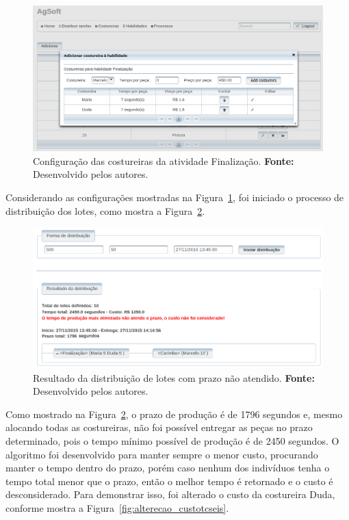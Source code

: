 \begin{figure}[h!]
	\centerline{\includegraphics[width=14.7cm]{./imagens/configuracao_costureiras_teste6.png}}
	\caption[Configuração das costureiras da atividade Finalização.] 
	{Configuração das costureiras da atividade Finalização. \textbf{Fonte:} Desenvolvido pelos
	autores.}
	\label{fig:configuracao_costureiras_teste6}
\end{figure}

\par Considerando as configurações mostradas na
Figura~\ref{fig:configuracao_costureiras_teste6}, foi iniciado o processo de
distribuição dos lotes, como mostra a Figura~\ref{fig:resultado1_teste6}.

\begin{figure}[h!]
	\centerline{\includegraphics[width=13cm]{./imagens/resultado1_teste6.png}}
	\caption[Resultado da distribuição de lotes com prazo não atendido.] 
	{Resultado da distribuição de lotes com prazo não atendido. \textbf{Fonte:} Desenvolvido pelos
	autores.}
	\label{fig:resultado1_teste6}
\end{figure}

\par Como mostrado na Figura~\ref{fig:resultado1_teste6}, o prazo de produção
é de 1796 segundos e, mesmo alocando todas as costureiras, não foi possível
entregar as peças no prazo determinado, pois o tempo mínimo possível de produção
é de 2450 segundos. O algoritmo foi desenvolvido para manter sempre o menor custo, procurando manter o tempo
dentro do prazo, porém caso nenhum dos indivíduos tenha o tempo total menor que o prazo,
então o melhor tempo é retornado e o custo é desconsiderado.
Para demonstrar isso, foi alterado o custo da costureira Duda, conforme mostra a
Figura~\ref{fig:alterecao_custotcseis}.
 

